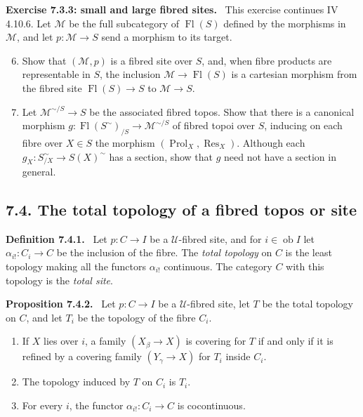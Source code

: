 \documentclass[11pt]{article}
\newcommand{\U}{\mathcal{U}}
\newcommand{\M}{\mathcal{M}}
\newcommand{\ob}{\operatorname{ob}}
\newcommand{\Fl}{\operatorname{Fl}}
\newcommand{\Res}{\operatorname{Res}}
\newcommand{\Prol}{\operatorname{Prol}}
\newenvironment{statement}[1]{\par\medskip\noindent\textbf{#1.}\ }{\par\medskip}
\newenvironment{remarktext}[1]{\par\medskip\noindent\textbf{#1.}\ }{\par\medskip}
\begin{document}
\begin{remarktext}{Exercise 7.3.3: small and large fibred sites}
This exercise continues IV 4.10.6. Let \(\M\) be the full subcategory of \(\Fl(S)\) defined by the morphisms in \(\mathcal M\), and let \(p:\M\to S\) send a morphism to its target.
\begin{enumerate}[label=\arabic*\textdegree)]
\setcounter{enumi}{5}
\item Show that \((\M,p)\) is a fibred site over \(S\), and, when fibre products are representable in \(S\), the inclusion \(\M\to\Fl(S)\) is a cartesian morphism from the fibred site \(\Fl(S)\to S\) to \(\M\to S\).
\item Let \(\M^{\sim/S}\to S\) be the associated fibred topos. Show that there is a canonical morphism \(g:\Fl(S^{\sim})_{/S}\to\M^{\sim/S}\) of fibred topoi over \(S\), inducing on each fibre over \(X\in S\) the morphism \((\Prol_X,\Res_X)\). Although each \(g_X:S^{\sim}_{/X}\to S(X)^{\sim}\) has a section, show that \(g\) need not have a section in general.
\end{enumerate}
\end{remarktext}

\subsection*{7.4. The total topology of a fibred topos or site}

\begin{statement}{Definition 7.4.1}
Let \(p:C\to I\) be a \(\U\)-fibred site, and for \(i\in\ob I\) let \(\alpha_{i!}:C_i\to C\) be the inclusion of the fibre. The \emph{total topology} on \(C\) is the least topology making all the functors \(\alpha_{i!}\) continuous. The category \(C\) with this topology is the \emph{total site}.
\end{statement}

\begin{statement}{Proposition 7.4.2}
Let \(p:C\to I\) be a \(\U\)-fibred site, let \(T\) be the total topology on \(C\), and let \(T_i\) be the topology of the fibre \(C_i\).
\begin{enumerate}[label=\arabic*)]
\item If \(X\) lies over \(i\), a family \((X_\beta\to X)\) is covering for \(T\) if and only if it is refined by a covering family \((Y_\gamma\to X)\) for \(T_i\) inside \(C_i\).
\item The topology induced by \(T\) on \(C_i\) is \(T_i\).
\item For every \(i\), the functor \(\alpha_{i!}:C_i\to C\) is cocontinuous.
\end{enumerate}
\end{statement}
\end{document}
